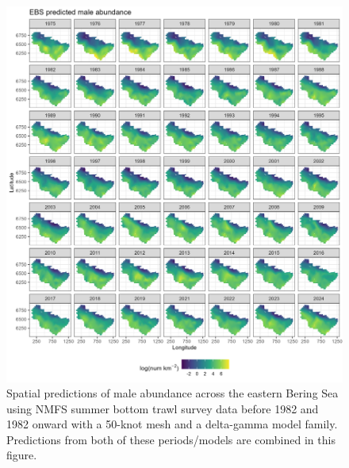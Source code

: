 \documentclass[
]{article}
\begin{document}
\begin{figure}

{\centering \includegraphics[width=1\linewidth,height=1\textheight]{../BAIRDI/Figures/EBS_male_spatabund} 

}

\caption{Spatial predictions of male abundance across the eastern Bering Sea using NMFS summer bottom trawl survey data before 1982 and 1982 onward with a 50-knot mesh and a delta-gamma model family. Predictions from both of these periods/models are combined in this figure.}\label{fig:spatpred-abund-50-male}
\end{figure}
\end{document}
